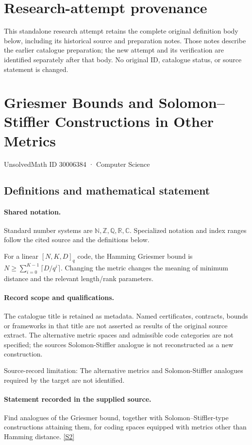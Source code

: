 \documentclass[11pt]{article}
\begin{document}
\section*{Research-attempt provenance}
This standalone research attempt retains the complete original definition body below,
including its historical source and preparation notes. Those notes describe the
earlier catalogue preparation; the new attempt and its verification are identified
separately after that body. No original ID, catalogue status, or source statement is changed.

\section{Griesmer Bounds and Solomon–Stiffler Constructions in Other Metrics}\label{30006384}
{\small UnsolvedMath ID 30006384 · Computer Science}
\subsection{Definitions and mathematical statement}

\paragraph{Shared notation.}Standard number systems are $\mathbb N,\mathbb Z,\mathbb Q,\mathbb R,\mathbb C$. Specialized notation and index ranges follow the cited source and the definitions below.


For a linear $[N,K,D]_q$ code, the Hamming Griesmer bound is $N\geq\sum_{i=0}^{K-1}\lceil D/q^i\rceil$. Changing the metric changes the meaning of minimum distance and the relevant length/rank parameters.
\paragraph{Record scope and qualifications.}
The catalogue title is retained as metadata. Named certificates, contracts, bounds or frameworks in that title are not asserted as results of the original source extract.
The alternative metric spaces and admissible code categories are not specified; the source\textquotesingle s Solomon-Stiffler analogue is not reconstructed as a new construction.

Source-record limitation: The alternative metrics and Solomon-Stiffler analogues required by the target are not identified.
\paragraph{Statement recorded in the supplied source.}
Find analogues of the Griesmer bound, together with Solomon–Stiffler-type constructions attaining them, for coding spaces equipped with metrics other than Hamming distance. \href{https://doi.org/10.4171/owr/2025/41}{[S2]}
\end{document}
